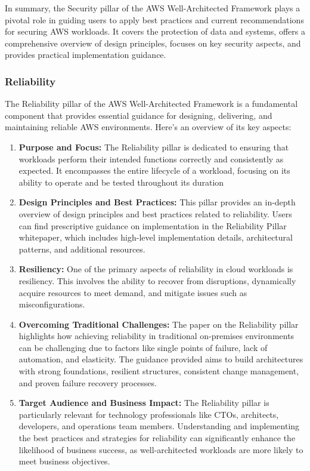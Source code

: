\documentclass{article}
\begin{document}
In summary, the Security pillar of the AWS Well-Architected Framework plays a pivotal role in guiding users to apply best practices and current recommendations for securing AWS workloads. It covers the protection of data and systems, offers a comprehensive overview of design principles, focuses on key security aspects, and provides practical implementation guidance.


\subsubsection{Reliability}
The Reliability pillar of the AWS Well-Architected Framework is a fundamental component that provides essential guidance for designing, delivering, and maintaining reliable AWS environments. Here's an overview of its key aspects:

\begin{enumerate}
    \item \textbf{Purpose and Focus:} The Reliability pillar is dedicated to ensuring that workloads perform their intended functions correctly and consistently as expected. It encompasses the entire lifecycle of a workload, focusing on its ability to operate and be tested throughout its duration
    \item \textbf{Design Principles and Best Practices:} This pillar provides an in-depth overview of design principles and best practices related to reliability. Users can find prescriptive guidance on implementation in the Reliability Pillar whitepaper, which includes high-level implementation details, architectural patterns, and additional resources.
    \item \textbf{Resiliency: } One of the primary aspects of reliability in cloud workloads is resiliency. This involves the ability to recover from disruptions, dynamically acquire resources to meet demand, and mitigate issues such as misconfigurations.
    \item \textbf{Overcoming Traditional Challenges:} The paper on the Reliability pillar highlights how achieving reliability in traditional on-premises environments can be challenging due to factors like single points of failure, lack of automation, and elasticity. The guidance provided aims to build architectures with strong foundations, resilient structures, consistent change management, and proven failure recovery processes.
    \item \textbf{Target Audience and Business Impact:} The Reliability pillar is particularly relevant for technology professionals like CTOs, architects, developers, and operations team members. Understanding and implementing the best practices and strategies for reliability can significantly enhance the likelihood of business success, as well-architected workloads are more likely to meet business objectives.
\end{enumerate}
\end{document}
